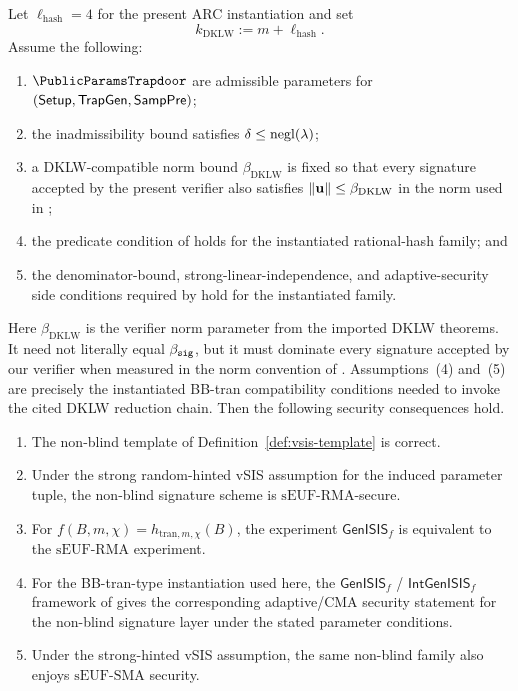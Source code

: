 \begin{lemma}\label{lem:vsis-unforgeability}
Let \(\ell_{\mathrm{hash}}=4\) for the present ARC instantiation and set
\[
  k_{\mathrm{DKLW}}:=m+\ell_{\mathrm{hash}}.
\]
Assume the following:
\begin{enumerate}[leftmargin=1.25em]
    \item \(\PublicParamsTrapdoor\) are admissible parameters for \((\mathsf{Setup},\mathsf{TrapGen},\mathsf{SampPre})\);
    \item the inadmissibility bound satisfies \(\delta\le \mathrm{negl}(\lambda)\);
    \item a DKLW-compatible norm bound \(\beta_{\mathrm{DKLW}}\) is fixed so that every signature accepted by
    the present verifier also satisfies \(\|\mathbf{u}\|\le \beta_{\mathrm{DKLW}}\) in the norm used in
    \cite{EPRINT:DKLW25};
    \item the predicate condition of \cite[Definition~7]{EPRINT:DKLW25} holds for the instantiated rational-hash
    family; and
    \item the denominator-bound, strong-linear-independence, and adaptive-security side conditions required by
    \cite[Theorems~4--8, Corollary~1, and Section~5.2]{EPRINT:DKLW25} hold for the instantiated family.
\end{enumerate}
Here \(\beta_{\mathrm{DKLW}}\) is the verifier norm parameter from the imported DKLW theorems. It need not literally
equal \(\beta_{\mathtt{sig}}\), but it must dominate every signature accepted by our verifier when measured in the norm convention
of \cite{EPRINT:DKLW25}. Assumptions~(4) and~(5) are precisely the instantiated BB-tran compatibility conditions needed
to invoke the cited DKLW reduction chain.
Then the following security consequences hold.
\begin{enumerate}[leftmargin=1.25em]
    \item The non-blind template of Definition~\ref{def:vsis-template} is correct.
    \item Under the strong random-hinted vSIS assumption for the induced parameter tuple, the non-blind
    signature scheme is \(\mathrm{sEUF\mbox{-}RMA}\)-secure.
    \item For \(f(B,m,\chi)=h_{\mathrm{tran},m,\chi}(B)\), the experiment \(\mathsf{GenISIS}_f\) is
    equivalent to the \(\mathrm{sEUF\mbox{-}RMA}\) experiment.
    \item For the BB-tran-type instantiation used here, the \(\mathsf{GenISIS}_f\) /
    \(\mathsf{IntGenISIS}_f\) framework of \cite[Section~5.2 and Theorem~6]{EPRINT:DKLW25} gives the corresponding
    adaptive/CMA security statement for the non-blind signature layer under the stated parameter conditions.
    \item Under the strong-hinted vSIS assumption, the same non-blind family also enjoys
    \(\mathrm{sEUF\mbox{-}SMA}\) security.
\end{enumerate}
\end{lemma}

